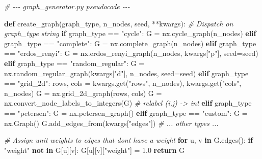 \documentclass[
  11pt,
]{report}
\newenvironment{Shaded}{}{}
\newcommand{\CommentTok}[1]{\textcolor[rgb]{0.38,0.63,0.69}{\textit{#1}}}
\newcommand{\ControlFlowTok}[1]{\textcolor[rgb]{0.00,0.44,0.13}{\textbf{#1}}}
\newcommand{\FloatTok}[1]{\textcolor[rgb]{0.25,0.63,0.44}{#1}}
\newcommand{\KeywordTok}[1]{\textcolor[rgb]{0.00,0.44,0.13}{\textbf{#1}}}
\newcommand{\NormalTok}[1]{#1}
\newcommand{\OperatorTok}[1]{\textcolor[rgb]{0.40,0.40,0.40}{#1}}
\newcommand{\StringTok}[1]{\textcolor[rgb]{0.25,0.44,0.63}{#1}}
\begin{document}
\begin{Shaded}
\begin{Highlighting}[]
\CommentTok{\# {-}{-}{-} graph\_generator.py pseudocode {-}{-}{-}}

\KeywordTok{def}\NormalTok{ create\_graph(graph\_type, n\_nodes, seed, }\OperatorTok{**}\NormalTok{kwargs):}
    \CommentTok{\# Dispatch on graph\_type string}
    \ControlFlowTok{if}\NormalTok{ graph\_type }\OperatorTok{==} \StringTok{"cycle"}\NormalTok{:}
\NormalTok{        G }\OperatorTok{=}\NormalTok{ nx.cycle\_graph(n\_nodes)}
    \ControlFlowTok{elif}\NormalTok{ graph\_type }\OperatorTok{==} \StringTok{"complete"}\NormalTok{:}
\NormalTok{        G }\OperatorTok{=}\NormalTok{ nx.complete\_graph(n\_nodes)}
    \ControlFlowTok{elif}\NormalTok{ graph\_type }\OperatorTok{==} \StringTok{"erdos\_renyi"}\NormalTok{:}
\NormalTok{        G }\OperatorTok{=}\NormalTok{ nx.erdos\_renyi\_graph(n\_nodes, kwargs[}\StringTok{"p"}\NormalTok{], seed}\OperatorTok{=}\NormalTok{seed)}
    \ControlFlowTok{elif}\NormalTok{ graph\_type }\OperatorTok{==} \StringTok{"random\_regular"}\NormalTok{:}
\NormalTok{        G }\OperatorTok{=}\NormalTok{ nx.random\_regular\_graph(kwargs[}\StringTok{"d"}\NormalTok{], n\_nodes, seed}\OperatorTok{=}\NormalTok{seed)}
    \ControlFlowTok{elif}\NormalTok{ graph\_type }\OperatorTok{==} \StringTok{"grid\_2d"}\NormalTok{:}
\NormalTok{        rows, cols }\OperatorTok{=}\NormalTok{ kwargs.get(}\StringTok{"rows"}\NormalTok{, n\_nodes), kwargs.get(}\StringTok{"cols"}\NormalTok{, n\_nodes)}
\NormalTok{        G }\OperatorTok{=}\NormalTok{ nx.grid\_2d\_graph(rows, cols)}
\NormalTok{        G }\OperatorTok{=}\NormalTok{ nx.convert\_node\_labels\_to\_integers(G)  }\CommentTok{\# relabel (i,j) {-}\textgreater{} int}
    \ControlFlowTok{elif}\NormalTok{ graph\_type }\OperatorTok{==} \StringTok{"petersen"}\NormalTok{:}
\NormalTok{        G }\OperatorTok{=}\NormalTok{ nx.petersen\_graph()}
    \ControlFlowTok{elif}\NormalTok{ graph\_type }\OperatorTok{==} \StringTok{"custom"}\NormalTok{:}
\NormalTok{        G }\OperatorTok{=}\NormalTok{ nx.Graph()}
\NormalTok{        G.add\_edges\_from(kwargs[}\StringTok{"edges"}\NormalTok{])}
    \CommentTok{\# ... other types ...}

    \CommentTok{\# Assign unit weights to edges that don\textquotesingle{}t have a weight}
    \ControlFlowTok{for}\NormalTok{ u, v }\KeywordTok{in}\NormalTok{ G.edges():}
        \ControlFlowTok{if} \StringTok{"weight"} \KeywordTok{not} \KeywordTok{in}\NormalTok{ G[u][v]:}
\NormalTok{            G[u][v][}\StringTok{"weight"}\NormalTok{] }\OperatorTok{=} \FloatTok{1.0}
    \ControlFlowTok{return}\NormalTok{ G}



\end{Highlighting}
\end{Shaded}
\end{document}
